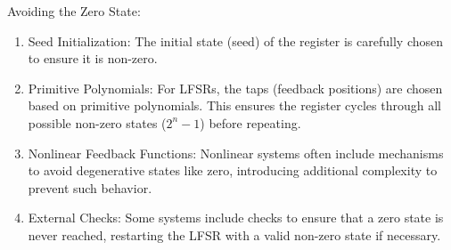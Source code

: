 Avoiding the Zero State:
\begin{enumerate}
    \item Seed Initialization: The initial state (seed) of the register is carefully chosen to ensure it is non-zero.
    \item Primitive Polynomials: For LFSRs, the taps (feedback positions) are chosen based on primitive polynomials. This ensures the register cycles through all possible non-zero states ($2^n - 1$) before repeating.
    \item Nonlinear Feedback Functions: Nonlinear systems often include mechanisms to avoid degenerative states like zero, introducing additional complexity to prevent such behavior.
    \item External Checks: Some systems include checks to ensure that a zero state is never reached, restarting the LFSR with a valid non-zero state if necessary.
\end{enumerate}